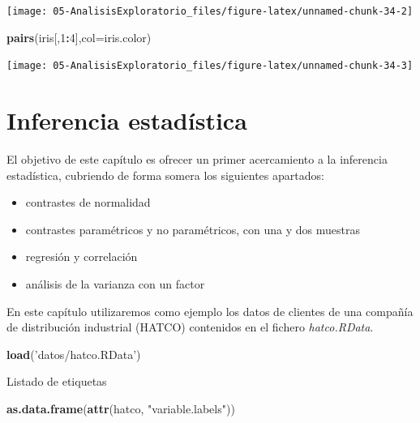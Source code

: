 \documentclass[]{book}
\newenvironment{Shaded}{\begin{snugshade}}{\end{snugshade}}
\newcommand{\KeywordTok}[1]{\textcolor[rgb]{0.13,0.29,0.53}{\textbf{#1}}}
\newcommand{\DataTypeTok}[1]{\textcolor[rgb]{0.13,0.29,0.53}{#1}}
\newcommand{\DecValTok}[1]{\textcolor[rgb]{0.00,0.00,0.81}{#1}}
\newcommand{\StringTok}[1]{\textcolor[rgb]{0.31,0.60,0.02}{#1}}
\newcommand{\OperatorTok}[1]{\textcolor[rgb]{0.81,0.36,0.00}{\textbf{#1}}}
\newcommand{\NormalTok}[1]{#1}
\providecommand{\tightlist}{%
  \setlength{\itemsep}{0pt}\setlength{\parskip}{0pt}}
\begin{document}
\begin{center}\texttt{[image: 05-AnalisisExploratorio\_files/figure-latex/unnamed-chunk-34-2]} \end{center}

\begin{Shaded}
\begin{Highlighting}[]
\KeywordTok{pairs}\NormalTok{(iris[,}\DecValTok{1}\OperatorTok{:}\DecValTok{4}\NormalTok{],}\DataTypeTok{col=}\NormalTok{iris.color)}
\end{Highlighting}
\end{Shaded}

\begin{center}\texttt{[image: 05-AnalisisExploratorio\_files/figure-latex/unnamed-chunk-34-3]} \end{center}

\chapter{Inferencia estadística}\label{inferencia-estadistica}

El objetivo de este capítulo es ofrecer un primer acercamiento a la
inferencia estadística, cubriendo de forma somera los siguientes
apartados:

\begin{itemize}
\tightlist
\item
  contrastes de normalidad
\item
  contrastes paramétricos y no paramétricos, con una y dos muestras
\item
  regresión y correlación
\item
  análisis de la varianza con un factor
\end{itemize}

En este capítulo utilizaremos como ejemplo los datos de clientes de una
compañía de distribución industrial (HATCO) contenidos en el fichero
\emph{hatco.RData}.

\begin{Shaded}
\begin{Highlighting}[]
\KeywordTok{load}\NormalTok{(}\StringTok{'datos/hatco.RData'}\NormalTok{)}
\end{Highlighting}
\end{Shaded}

Listado de etiquetas

\begin{Shaded}
\begin{Highlighting}[]
\KeywordTok{as.data.frame}\NormalTok{(}\KeywordTok{attr}\NormalTok{(hatco, }\StringTok{"variable.labels"}\NormalTok{))}
\end{Highlighting}
\end{Shaded}
\end{document}
